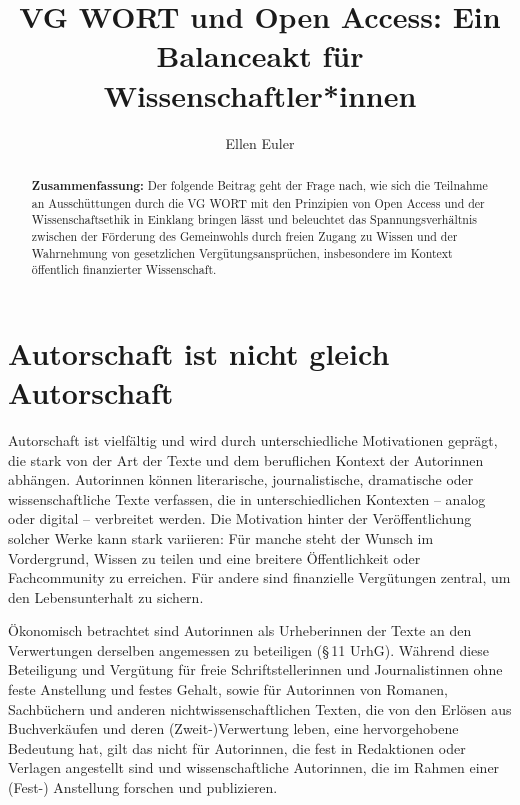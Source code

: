 \documentclass[a4paper,
fontsize=11pt,
oneside,
numbers=noperiodatend,
parskip=half-,
bibliography=totoc,
final
]{scrartcl}
\title{\LARGE{VG WORT und Open Access: Ein Balanceakt für Wissenschaftler*innen}}%
\author{Ellen Euler} %
\date{}
\begin{document}
\maketitle
\thispagestyle{fancyplain} 

\begin{abstract}
\noindent
\textbf{Zusammenfassung:} Der folgende Beitrag geht der Frage nach, wie
sich die Teilnahme an Ausschüttungen durch die VG WORT mit den
Prinzipien von Open Access und der Wissenschaftsethik in Einklang
bringen lässt und beleuchtet das Spannungsverhältnis zwischen der
Förderung des Gemeinwohls durch freien Zugang zu Wissen und der
Wahrnehmung von gesetzlichen Vergütungsansprüchen, insbesondere im
Kontext öffentlich finanzierter Wissenschaft.
\end{abstract}

\hypertarget{autorschaft-ist-nicht-gleich-autorschaft}{%
\section{Autorschaft ist nicht gleich
Autorschaft}\label{autorschaft-ist-nicht-gleich-autorschaft}}

Autorschaft ist vielfältig und wird durch unterschiedliche Motivationen
geprägt, die stark von der Art der Texte und dem beruflichen Kontext der
Autorinnen abhängen. Autorinnen können literarische, journalistische,
dramatische oder wissenschaftliche Texte verfassen, die in
unterschiedlichen Kontexten -- analog oder digital -- verbreitet werden.
Die Motivation hinter der Veröffentlichung solcher Werke kann stark
variieren: Für manche steht der Wunsch im Vordergrund, Wissen zu teilen
und eine breitere Öffentlichkeit oder Fachcommunity zu erreichen. Für
andere sind finanzielle Vergütungen zentral, um den Lebensunterhalt zu
sichern.

Ökonomisch betrachtet sind Autorinnen als Urheberinnen der Texte an den
Verwertungen derselben angemessen zu beteiligen (§\,11 UrhG). Während
diese Beteiligung und Vergütung für freie Schriftstellerinnen und
Journalistinnen ohne feste Anstellung und festes Gehalt, sowie für
Autorinnen von Romanen, Sachbüchern und anderen nichtwissenschaftlichen
Texten, die von den Erlösen aus Buchverkäufen und deren
(Zweit-)Verwertung leben, eine hervorgehobene Bedeutung hat, gilt das
nicht für Autorinnen, die fest in Redaktionen oder Verlagen angestellt
sind und wissenschaftliche Autorinnen, die im Rahmen einer (Fest-)
Anstellung forschen und publizieren.
\end{document}
